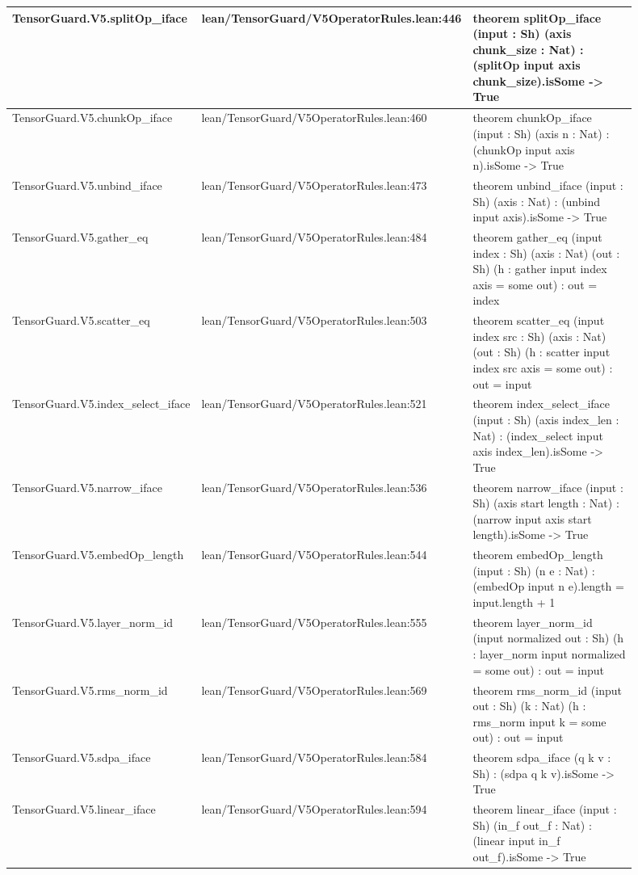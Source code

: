 \documentclass[10pt]{article}
\begin{document}
\begin{longtable}{|p{0.30\linewidth}|p{0.13\linewidth}|p{0.47\linewidth}|}
\hline
TensorGuard.V5.splitOp\_iface & lean/TensorGuard/V5OperatorRules.lean:446 & theorem splitOp\_iface (input : Sh) (axis chunk\_size : Nat) : (splitOp input axis chunk\_size).isSome -> True \\
\hline
TensorGuard.V5.chunkOp\_iface & lean/TensorGuard/V5OperatorRules.lean:460 & theorem chunkOp\_iface (input : Sh) (axis n : Nat) : (chunkOp input axis n).isSome -> True \\
\hline
TensorGuard.V5.unbind\_iface & lean/TensorGuard/V5OperatorRules.lean:473 & theorem unbind\_iface (input : Sh) (axis : Nat) : (unbind input axis).isSome -> True \\
\hline
TensorGuard.V5.gather\_eq & lean/TensorGuard/V5OperatorRules.lean:484 & theorem gather\_eq (input index : Sh) (axis : Nat) (out : Sh) (h : gather input index axis = some out) : out = index \\
\hline
TensorGuard.V5.scatter\_eq & lean/TensorGuard/V5OperatorRules.lean:503 & theorem scatter\_eq (input index src : Sh) (axis : Nat) (out : Sh) (h : scatter input index src axis = some out) : out = input \\
\hline
TensorGuard.V5.index\_select\_iface & lean/TensorGuard/V5OperatorRules.lean:521 & theorem index\_select\_iface (input : Sh) (axis index\_len : Nat) : (index\_select input axis index\_len).isSome -> True \\
\hline
TensorGuard.V5.narrow\_iface & lean/TensorGuard/V5OperatorRules.lean:536 & theorem narrow\_iface (input : Sh) (axis start length : Nat) : (narrow input axis start length).isSome -> True \\
\hline
TensorGuard.V5.embedOp\_length & lean/TensorGuard/V5OperatorRules.lean:544 & theorem embedOp\_length (input : Sh) (n e : Nat) : (embedOp input n e).length = input.length + 1 \\
\hline
TensorGuard.V5.layer\_norm\_id & lean/TensorGuard/V5OperatorRules.lean:555 & theorem layer\_norm\_id (input normalized out : Sh) (h : layer\_norm input normalized = some out) : out = input \\
\hline
TensorGuard.V5.rms\_norm\_id & lean/TensorGuard/V5OperatorRules.lean:569 & theorem rms\_norm\_id (input out : Sh) (k : Nat) (h : rms\_norm input k = some out) : out = input \\
\hline
TensorGuard.V5.sdpa\_iface & lean/TensorGuard/V5OperatorRules.lean:584 & theorem sdpa\_iface (q k v : Sh) : (sdpa q k v).isSome -> True \\
\hline
TensorGuard.V5.linear\_iface & lean/TensorGuard/V5OperatorRules.lean:594 & theorem linear\_iface (input : Sh) (in\_f out\_f : Nat) : (linear input in\_f out\_f).isSome -> True \\

\end{longtable}
\end{document}
